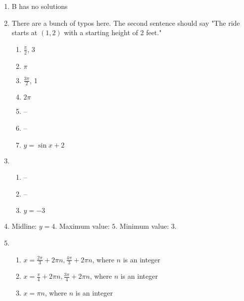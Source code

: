 \documentclass{article}
\begin{document}
\begin{enumerate}
\item B has no solutions

\item There are a bunch of typos here. The second sentence should say "The ride starts at $(1,2)$ with a starting height of 2 feet."

	\begin{enumerate}
	
	\item $\frac{\pi}{2}$, 3
	
	\item $\pi$
	
	\item $\frac{3\pi}{2}$, 1
	
	\item $2\pi$
	
	\item --
	
	\item --
	
	\item $y = \sin x + 2$
	
	\end{enumerate}

\item 

	\begin{enumerate}
	
	\item --
	
	\item --
	
	\item $y = -3$
	
	\end{enumerate}
	
\item Midline: $y = 4$. Maximum value: $5$. Minimum value: $3$.

\item

	\begin{enumerate}
	
	\item $x = \frac{2\pi}{3} + 2\pi n,  \frac{4\pi}{3} + 2\pi n$, where $n$ is an integer
	
	\item $x = \frac{\pi}{4} + 2\pi n, \frac{3\pi}{4} + 2\pi n$, where $n$ is an integer
	
	\item $x = \pi n$, where $n$ is an integer
	
	\end{enumerate}
	

\end{enumerate}
\end{document}
